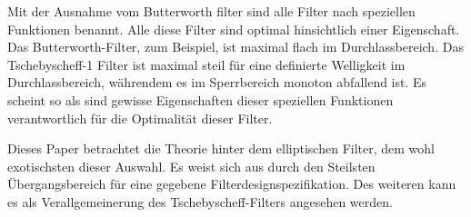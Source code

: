 Mit der Ausnahme vom Butterworth filter sind alle Filter nach speziellen Funktionen benannt.
Alle diese Filter sind optimal hinsichtlich einer Eigenschaft.
Das Butterworth-Filter, zum Beispiel, ist maximal flach im Durchlassbereich.
Das Tschebyscheff-1 Filter ist maximal steil für eine definierte Welligkeit im Durchlassbereich, währendem es im Sperrbereich monoton abfallend ist.
Es scheint so als sind gewisse Eigenschaften dieser speziellen Funktionen verantwortlich für die Optimalität dieser Filter.

Dieses Paper betrachtet die Theorie hinter dem elliptischen Filter, dem wohl exotischsten dieser Auswahl.
Es weist sich aus durch den Steilsten Übergangsbereich für eine gegebene Filterdesignspezifikation.
Des weiteren kann es als Verallgemeinerung des Tschebyscheff-Filters angesehen werden.


